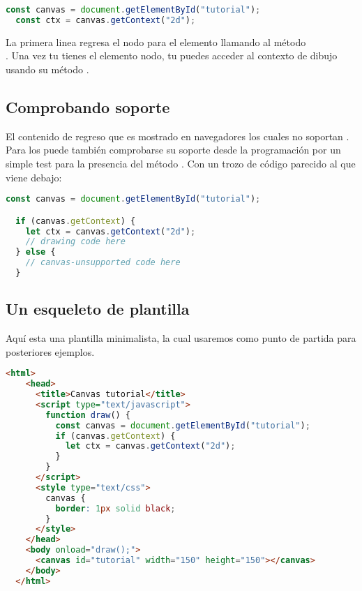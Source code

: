 \vspace{0.5cm} %
\begin{lstlisting}[language=TypeScript, style=mystyle]
  const canvas = document.getElementById("tutorial");
  const ctx = canvas.getContext("2d");
\end{lstlisting}
\vspace{0.5cm} %

La primera linea regresa el nodo  para el elemento  llamando al método \\ . Una vez tu tienes el elemento nodo, tu puedes acceder al contexto de dibujo usando su método .

\subsection{Comprobando soporte}

El contenido de regreso que es mostrado en navegadores los cuales no soportan . Para los  puede también comprobarse su soporte desde la programación por un simple test para la presencia del método . Con un trozo de código parecido al que viene debajo:

\vspace{0.5cm} %
\begin{lstlisting}[language=TypeScript, style=mystyle]
  const canvas = document.getElementById("tutorial");

  if (canvas.getContext) {
    let ctx = canvas.getContext("2d");
    // drawing code here
  } else {
    // canvas-unsupported code here
  }
\end{lstlisting}
\vspace{0.5cm} %

\newpage %

\subsection{Un esqueleto de plantilla}

Aquí esta una plantilla minimalista, la cual usaremos como punto de partida para posteriores ejemplos.

\vspace{0.5cm} %
\begin{lstlisting}[language=HTML, style=mystyle2]
  <html>
    <head>
      <title>Canvas tutorial</title>
      <script type="text/javascript">
        function draw() {
          const canvas = document.getElementById("tutorial");
          if (canvas.getContext) {
            let ctx = canvas.getContext("2d");
          }
        }
      </script>
      <style type="text/css">
        canvas {
          border: 1px solid black;
        }
      </style>
    </head>
    <body onload="draw();">
      <canvas id="tutorial" width="150" height="150"></canvas>
    </body>
  </html>
\end{lstlisting}
\vspace{0.5cm} %

